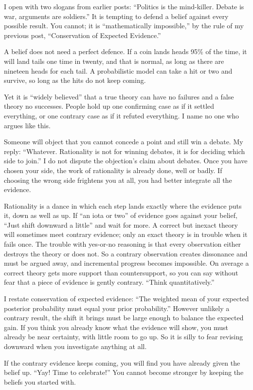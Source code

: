 
I open with two slogans from earlier posts: ``Politics is the mind-killer. Debate is war, arguments are soldiers.'' It is tempting to defend a belief against every possible result. You cannot; it is ``mathematically impossible,'' by the rule of my previous post, ``Conservation of Expected Evidence.''

A belief does not need a perfect defence. If a coin lands heads 95\% of the time, it will land tails one time in twenty, and that is normal, as long as there are nineteen heads for each tail. A probabilistic model can take a hit or two and survive, so long as the hits do not keep coming.

Yet it is ``widely believed'' that a true theory can have no failures and a false theory no successes. People hold up one confirming case as if it settled everything, or one contrary case as if it refuted everything. I name no one who argues like this.

Someone will object that you cannot concede a point and still win a debate. My reply: ``Whatever. Rationality is not for winning debates, it is for deciding which side to join.'' I do not dispute the objection's claim about debates. Once you have chosen your side, the work of rationality is already done, well or badly. If choosing the wrong side frightens you at all, you had better integrate all the evidence.

Rationality is a dance in which each step lands exactly where the evidence puts it, down as well as up. If ``an iota or two'' of evidence goes against your belief, ``Just shift downward a little'' and wait for more.  A correct but inexact theory will sometimes meet contrary evidence; only an exact theory is in trouble when it fails once. The trouble with yes-or-no reasoning is that every observation either destroys the theory or does not. So a contrary observation creates dissonance and must be argued away, and incremental progress becomes impossible. On average a correct theory gets more support than countersupport, so you can say without fear that a piece of evidence is gently contrary. ``Think quantitatively.''

I restate conservation of expected evidence: ``The weighted mean of your expected posterior probability must equal your prior probability.'' However unlikely a contrary result, the shift it brings must be large enough to balance the expected gain. If you think you already know what the evidence will show, you must already be near certainty, with little room to go up. So it is silly to fear revising downward when you investigate anything at all. 

If the contrary evidence keeps coming, you will find you have already given the belief up. ``Yay! Time to celebrate!'' You cannot become stronger by keeping the beliefs you started with.
